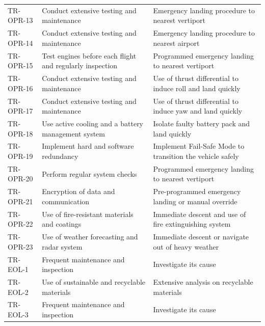 \begin{table}[H]
{\begin{tabular}{l|l|l}
TR-OPR-13        & Conduct extensive testing and maintenance                & Emergency landing  procedure to nearest vertiport           \\
TR-OPR-14        & Conduct extensive testing and maintenance                & Emergency landing  procedure to nearest airport             \\
TR-OPR-15        & Test engines before each flight and regularly inspection & Programmed emergency landing  to nearest vertiport          \\
TR-OPR-16        & Conduct extensive testing and maintenance                & Use of thrust differential to induce roll and  land quickly \\
TR-OPR-17        & Conduct extensive testing and maintenance                & Use of thrust differential to induce yaw and land quickly   \\
TR-OPR-18        & Use  active cooling and a  battery management system     & Isolate faulty battery pack and land quickly  \\
TR-OPR-19        & Implement hard and software redundancy                   & Implement Fail-Safe Mode to transition the vehicle safely   \\
TR-OPR-20        & Perform regular system checks                            & Programmed emergency landing to nearest vertiport           \\
TR-OPR-21        & Encryption of data and communication                     & Pre-programmed emergency landing or manual override         \\
TR-OPR-22        & Use of fire-resistant materials and coatings             & Immediate descent and use of fire extinguishing system      \\
TR-OPR-23        & Use of weather forecasting and radar system              & Immediate descent or navigate out of  heavy weather         \\
TR-EOL-1         & Frequent maintenance and inspection                      & Investigate its cause                                       \\
TR-EOL-2         & Use of sustainable and recyclable materials              & Extensive analysis on recyclable materials                  \\
TR-EOL-3         & Frequent maintenance and inspection                      & Investigate its cause  \\
\bottomrule
\end{tabular}%
}
\end{table}


